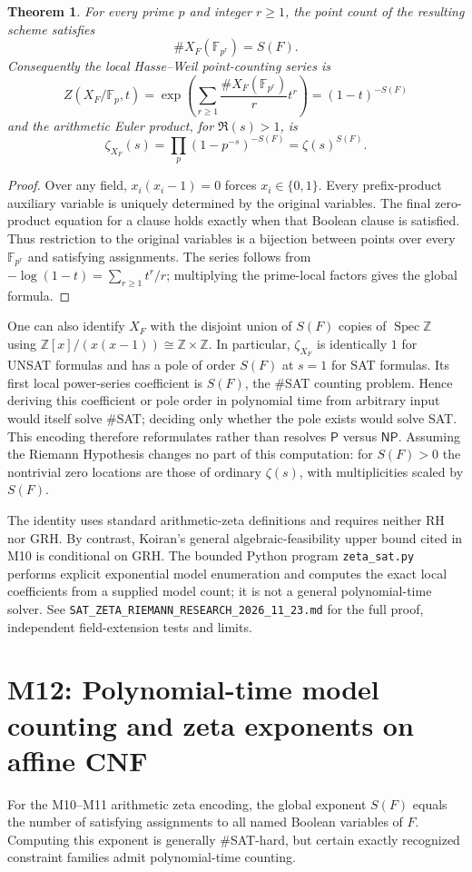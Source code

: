 \documentclass[11pt,a4paper]{article}
\newtheorem{theorem}{Theorem}
\begin{document}
\begin{theorem}
For every prime $p$ and integer $r\ge1$, the point count of the
resulting scheme satisfies
\[
\#X_F(\mathbb F_{p^r})=S(F).
\]
Consequently the local Hasse--Weil point-counting series is
\[
Z(X_F/\mathbb F_p,t)
=\exp\left(\sum_{r\ge1}\frac{\#X_F(\mathbb F_{p^r})}{r}t^r\right)
=(1-t)^{-S(F)}
\]
and the arithmetic Euler product, for $\Re(s)>1$, is
\[
\zeta_{X_F}(s)=\prod_p(1-p^{-s})^{-S(F)}
=\zeta(s)^{S(F)}.
\]
\end{theorem}
\begin{proof}
Over any field, $x_i(x_i-1)=0$ forces $x_i\in\{0,1\}$.
Every prefix-product auxiliary variable is uniquely determined
by the original variables. The final zero-product equation for a
clause holds exactly when that Boolean clause is satisfied.
Thus restriction to the original variables is a bijection between
points over every $\mathbb F_{p^r}$ and satisfying assignments.
The series follows from
$-\log(1-t)=\sum_{r\ge1} t^r/r$; multiplying the prime-local
factors gives the global formula.
\end{proof}

One can also identify $X_F$ with the disjoint union of $S(F)$
copies of $\operatorname{Spec}\mathbb Z$ using
$\mathbb Z[x]/(x(x-1))\cong\mathbb Z\times\mathbb Z$.
In particular, $\zeta_{X_F}$ is identically $1$ for UNSAT
formulas and has a pole of order $S(F)$ at $s=1$ for SAT
formulas. Its first local power-series coefficient is $S(F)$,
the \#SAT counting problem. Hence deriving this coefficient or
pole order in polynomial time from arbitrary input would itself
solve \#SAT; deciding only whether the pole exists would solve
SAT. This encoding therefore reformulates rather than resolves
$\mathsf P$ versus $\mathsf{NP}$. Assuming the Riemann Hypothesis
changes no part of this computation: for $S(F)>0$ the nontrivial
zero locations are those of ordinary $\zeta(s)$, with
multiplicities scaled by $S(F)$.

The identity uses standard arithmetic-zeta definitions
\cite{musta} and requires neither RH nor GRH. By contrast,
Koiran's general algebraic-feasibility upper bound cited in M10
is conditional on GRH. The bounded Python program
\texttt{zeta\_sat.py} performs explicit exponential model
enumeration and computes the exact local coefficients from a
supplied model count; it is not a general polynomial-time solver.
See \texttt{SAT\_ZETA\_RIEMANN\_RESEARCH\_2026\_11\_23.md}
for the full proof, independent field-extension tests and limits.

\section{M12: Polynomial-time model counting and zeta exponents on affine CNF}
For the M10--M11 arithmetic zeta encoding, the global exponent
$S(F)$ equals the number of satisfying assignments to all named
Boolean variables of $F$. Computing this exponent is generally
\#SAT-hard, but certain exactly recognized constraint families
admit polynomial-time counting.
\end{document}
